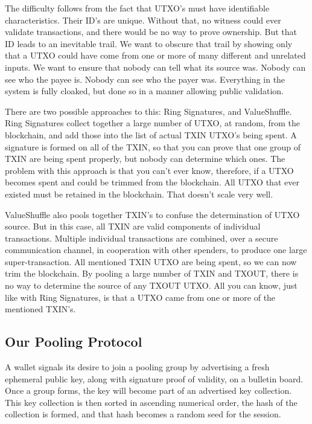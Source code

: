 \documentclass[a4paper, 10pt, conference]{ieeeconf}
\begin{document}
The difficulty follows from the fact that UTXO's must have identifiable characteristics. Their ID's are unique. Without that, no witness could ever validate transactions, and there would be no way to prove ownership. But that ID leads to an inevitable trail. We want to obscure that trail by showing only that a UTXO could have come from one or more of many different and unrelated inputs. We want to ensure that nobody can tell what its source was. Nobody can see who the payee is. Nobody can see who the payer was. Everything in the system is fully cloaked, but done so in a manner allowing public validation.

There are two possible approaches to this: Ring Signatures, and ValueShuffle. Ring Signatures collect together a large number of UTXO, at random, from the blockchain, and add those into the list of actual TXIN UTXO's being spent. A signature is formed on all of the TXIN, so that you can prove that one group of TXIN are being spent properly, but nobody can determine which ones. The problem with this approach is that you can't ever know, therefore, if a UTXO becomes spent and could be trimmed from the blockchain. All UTXO that ever existed must be retained in the blockchain. That doesn't scale very well.

ValueShuffle also pools together TXIN's to confuse the determination of UTXO source. But in this case, all TXIN are valid components of individual transactions. Multiple individual transactions are combined, over a secure communication channel, in cooperation with other spenders, to produce one large super-transaction. All mentioned TXIN UTXO are being spent, so we can now trim the blockchain. By pooling a large number of TXIN and TXOUT, there is no way to determine the source of any TXOUT UTXO. All you can know, just like with Ring Signatures, is that a UTXO came from one or more of the mentioned TXIN's.

\subsection{Our Pooling Protocol}
A wallet signals its desire to join a pooling group by advertising a fresh ephemeral public key, along with signature proof of validity, on a bulletin board. Once a group forms, the key will become part of an advertised key collection. This key collection is then sorted in ascending numerical order, the hash of the collection is formed, and that hash becomes a random seed for the session.
\end{document}
